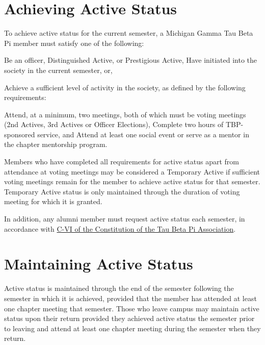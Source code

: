 \section{Achieving Active Status} To achieve active status for the current semester, a Michigan Gamma Tau Beta Pi member must satisfy one of the following:
\begin{enumsubsection} %
\itemnotoc	Be an officer, Distinguished Active, or Prestigious Active,
\itemnotoc	Have initiated into the society in the current semester, or,


\itemnotoc	Achieve a sufficient level of activity in the society, as defined by the following requirements:
\begin{enumsubsubsection}
\itemnotoc	Attend, at a minimum, two meetings, both of which must be  voting meetings (2nd Actives, 3rd Actives or Officer Elections),
\itemnotoc	Complete two hours of TBP-sponsored service, and
\itemnotoc	Attend at least one social event or serve as a mentor in the chapter mentorship program.
\end{enumsubsubsection} 
\end{enumsubsection} 
Members who have completed all requirements for active status apart from attendance at voting meetings may be considered a Temporary Active if sufficient voting meetings remain for the member to achieve active status for that semester. Temporary Active status is only maintained through the duration of voting meeting for which it is granted. 

In addition, any alumni member must request active status each semester, in accordance with \href{http://www.tbp.org/off/ConstBylaw.pdf}{C-VI of the Constitution of the Tau Beta Pi Association}.

\section{Maintaining Active Status} Active status is maintained through the end of the semester following the semester in which it is achieved, provided that the member has attended at least one chapter meeting that semester. Those who leave campus may maintain active status upon their return provided they achieved active status the semester prior to leaving and attend at least one chapter meeting during the semester when they return.


